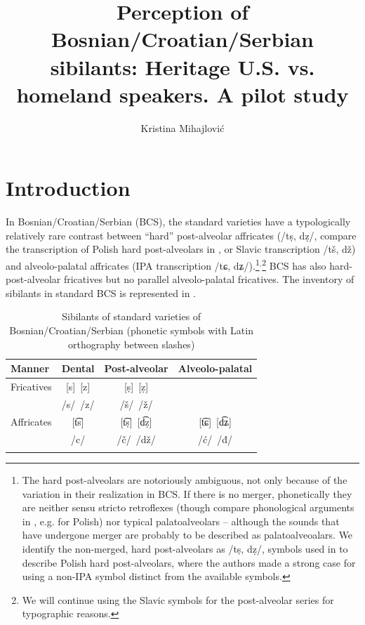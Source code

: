 \documentclass[output=paper,modfonts,newtxmath,hidelinks,]{langscibook}
\author{Kristina Mihajlović\affiliation{University of Arizona}\lastand{Małgorzata Ćavar\affiliation{Indiana University}}}
\title{Perception of Bosnian/Croatian/Serbian sibilants: Heritage U.S. vs. homeland speakers. A pilot study}
\begin{document}
\maketitle 
{}

 

\section{Introduction}

In Bosnian/Croatian/Serbian (BCS), the standard varieties have a typologically relatively rare contrast between “hard” post-alveolar affricates (/tṣ, dẓ/, compare the transcription of Polish  hard post-alveolars in \citet{Ladefoged-Disner2012}, or Slavic transcription /tš, dž) and alveolo-palatal affricates (IPA transcription /tɕ, dʑ/).\footnote{The hard post-alveolars are notoriously ambiguous, not only because of the variation in their realization in BCS. If there is no merger, phonetically they are neither sensu stricto retroflexes (though compare phonological arguments in \citealt{Hamann2003}, e.g. for Polish) nor typical palatoalveolars – although the sounds that have undergone merger are probably to be described as palatoalveoalars. We identify the non-merged, hard post-alveolars as /tṣ, dẓ/, symbols used in \citet[169]{Ladefoged-Disner2012} to describe Polish hard post-alveolars, where the authors made a strong case for using a non-IPA symbol distinct from the available symbols.}$^,$\footnote{We will continue using the Slavic symbols for the post-alveolar series for typographic reasons.} BCS has also hard-post-alveolar fricatives but no parallel alveolo-palatal fricatives. The inventory of sibilants in standard BCS is represented in .


\begin{table}
\begin{tabularx}{\textwidth}{XCCC} 
\lsptoprule 
 Manner &   {     Dental} & { Post-alveolar} & {     Alveolo-palatal}\\
\midrule 
Fricatives & [s]~[z]& [ṣ]~[ẓ] \\
           & /s/~/z/& /š/~/ž/ \\
\tablevspace           
Affricates & [t͡s]   & [t͡ṣ]~[d͡ẓ] & [t͡ɕ]~[d͡ʑ]\\
           & /c/    & /č/~/dž/  & /ć/~/đ/\\
\lspbottomrule
\end{tabularx}
\caption{\label{tab:mihajlovic:1} Sibilants of standard varieties of Bosnian/Croatian/Serbian (phonetic symbols with Latin orthography between slashes)}
\end{table}
\end{document}
